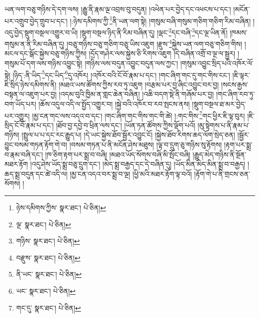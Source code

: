 ཡན་ལག་བཅུ་གཉིས་དེ་དག་ལས། །རྒྱུ་ནི་རྣམ་ལྔ་འབྲས་བུ་བདུན། །འཕེན་པར་བྱེད་དང་འཕངས་པ་དང་། །མངོན་པར་འགྲུབ་བྱེད་གྲུབ་པ་དང་། །:ཉེས་དམིགས་ཀྱི་\footnote{ཉེས་དམིགས་ཀྱིས་  སྣར་ཐང་།  པེ་ཅིན། }ནི་ཡན་ལག་སྟེ། །གསུམ་བཞི་གསུམ་གཅིག་གཅིག་རིམ་བཞིན། །འདུ་བྱེད་སྡུག་བསྔལ་འགྱུར་བ་ཡི། །སྡུག་བསྔལ་ཉིད་ནི་རིམ་བཞིན་དུ། །ལྡང་\footnote{ལྔ་  སྣར་ཐང་།  པེ་ཅིན། }དང་བཞི་\footnote{གཉིས་  སྣར་ཐང་།  པེ་ཅིན། }དང་ལྔ་ཡིན་ནོ། །ཁམས་གསུམ་ན་ནི་རིམ་བཞིན་དུ། །བཅུ་གཉིས་བཅུ་གཅིག་བཅུ་ཡིས་འཇུག །རྫུས་\footnote{བརྫུས་  སྣར་ཐང་།  པེ་ཅིན། }སྐྱེས་ཡན་ལག་བཅུ་གཅིག་གིས། །མངལ་དང་སྒོང་སྐྱེས་བཅུ་གཉིས་ཀྱིས། །དྲོད་གཤེར་ལས་སྐྱེས་ཅི་རིགས་འཇུག །དེ་བཞིན་འགྲོ་བ་ལྔ་ལ་སྦྱར། །གསུམ་པོ་དག་ལས་གཉིས་འབྱུང་སྟེ། །གཉིས་ལས་བདུན་འབྱུང་བདུན་ལས་ཀྱང་། །གསུམ་འབྱུང་སྲིད་པའི་འཁོར་ལོ་སྟེ། །ཉིད་:ནི་ཡིད་\footnote{ནི་ཡང་  སྣར་ཐང་།  པེ་ཅིན། }དང་ཡིད་\footnote{ཡང་  སྣར་ཐང་།  པེ་ཅིན། }དུ་འཁོར། །འཁོར་བའི་ངོ་བོ་རྣམ་པ་དང་། །གང་ཞིག་གང་དུ་གང་གིས་ངང་། །ཇི་ལྟར་ཇི་སྲིད་ཉེས་དམིགས་ནི། །མཐའ་ཡས་ཚོགས་ཀྱིས་རབ་ཏུ་འཇུག །བརྩམ་པར་བྱ་ཞིང་འབྱུང་བར་བྱ། །སངས་རྒྱས་བསྟན་ལ་འཇུག་པར་བྱ། །འདམ་བུའི་ཁྱིམ་ན་གླང་ཆེན་བཞིན། །འཆི་བདག་སྡེ་ནི་གཞོམ་པར་བྱ། །གང་ཞིག་རབ་ཏུ་བག་ཡོད་པར། །ཆོས་འདུལ་འདི་ལ་སྤྱོད་འགྱུར་བ། །སྐྱེ་བའི་འཁོར་བ་རབ་སྤངས་ནས། །སྡུག་བསྔལ་ཐ་མར་བྱེད་པར་འགྱུར། །མྱ་ངན་གང་ལས་འདའ་བ་དང་། །གང་ཞིག་གང་གིས་གང་གི་ཚེ། །:གང་གིས་\footnote{གང་དུ་  སྣར་ཐང་།  པེ་ཅིན། }གང་ཕྱིར་ཇི་ལྟ་བུར། །ཇི་སྲིད་ངོ་བོ་རྣམ་པ་དང་། །ཐོབ་བྱ་དབྱེ་བ་ཕྲིན་ལས་དང་། །ཡོན་ཏན་ཚོགས་ཀྱིས་ལྡོག་པའོ། །མུ་སྟེགས་པ་ནི་རྣམ་པ་གཉིས། །སྤྲུལ་པ་པ་དང་རང་རྒྱུད་པ། །དེ་ཡང་སྐྱེས་ཐོབ་སྦྱོར་འབྱུང་ངོ། །སྐྱེས་ཐོབ་རིགས་ཆད་ལོག་སྲེད་ཅན། །སྦྱོར་བྱུང་བསམ་གཏན་རྟོག་གེ་བ། །བསམ་གཏན་པ་ནི་མངོན་ཤེས་མཐུས། །ལྟ་བ་དྲུག་ཅུ་གཉིས་སུ་རྟོགས། །རྟག་པར་སྨྲ་བ་རྣམ་བཞི་དང་། །ཁ་ཅིག་རྟག་པར་སྨྲ་བ་བཞི། །མཐའ་ཡོད་སོགས་བཞི་མི་སྤོང་བཞི། །རྒྱུད་མེད་གཉིས་ནི་སྔོན་མཐར་རྟོག །འདུ་ཤེས་ཡོད་སྨྲ་བཅུ་དྲུག་དང་། །མེད་སྨྲ་བརྒྱད་དང་དེ་བཞིན་དུ། །ཡོད་མིན་མེད་མིན་སྨྲ་བ་བརྒྱད། །ཆད་སྨྲ་བདུན་དང་ཚེ་འདི་ལ། །མྱ་ངན་འདའ་བར་སྨྲ་བ་ལྔ། །ཕྱི་མའི་མཐར་རྟོག་ལྟ་བའོ། །རྟོག་གེ་པ་ནི་གྲངས་ཅན་སོགས། །
